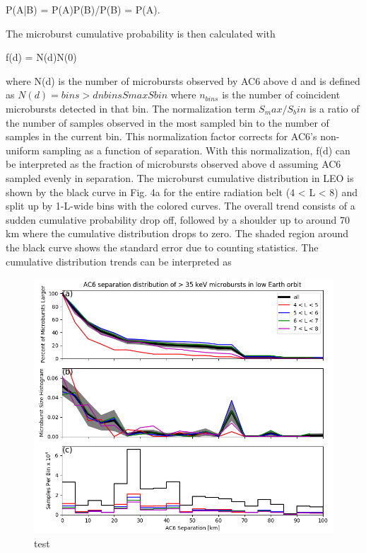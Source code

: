 \documentclass[draft]{agujournal2019}
\begin{document}
P(A|B) = P(A)P(B)/P(B) = P(A).


The microburst cumulative probability is then calculated with 

f(d) = N(d)N(0)

where N(d) is the number of microbursts observed by AC6 above d and is defined as
					$N(d) =bins > dnbinsSmaxSbin$
where $n_{bins}$ is the number of coincident microbursts detected in that bin. The normalization term $S_max/S_bin$ is a ratio of the number of samples observed in the most sampled bin to the number of samples in the current bin. This normalization factor corrects for AC6’s non-uniform sampling as a function of separation. With this normalization, f(d) can be interpreted as the fraction of microbursts observed above d assuming AC6 sampled evenly in separation.
	The microburst cumulative distribution in LEO is shown by the black curve in Fig. 4a for the entire radiation belt (4 < L < 8) and split up by 1-L-wide bins with the colored curves. The overall trend consists of a sudden cumulative probability drop off, followed by a shoulder up to around 70 km where the cumulative distribution drops to zero. The shaded region around the black curve shows the standard error due to counting statistics. The cumulative distribution trends can be interpreted as 
	
\begin{figure}
\includegraphics[width=\textwidth]{fig3.png}
\caption{test} \label{fig3}
\end{figure}
\end{document}
